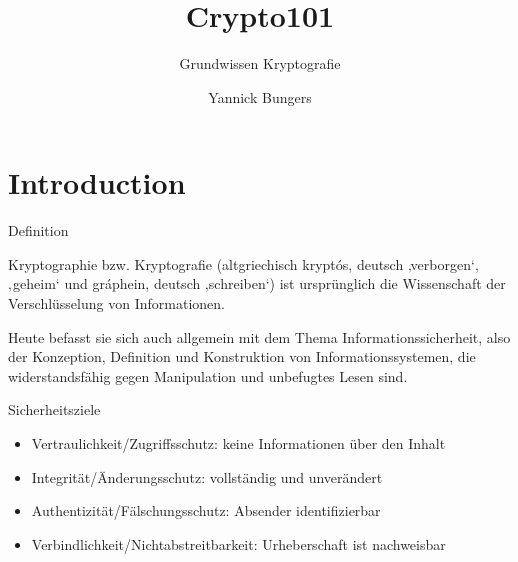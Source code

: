 \documentclass[10pt]{beamer}
\title{Crypto101}
\subtitle{Grundwissen Kryptografie}
\date{}
\author{Yannick Bungers}
\institute{Free and Open Source Software AG}
\begin{document}
	
	\maketitle
	
	
	\section[Ziele]{Introduction}
	
	\begin{frame}[fragile]{Definition}
		
		Kryptographie bzw. Kryptografie (altgriechisch kryptós, deutsch ‚verborgen‘, ‚geheim‘ und gráphein, deutsch ‚schreiben‘) ist ursprünglich die Wissenschaft der Verschlüsselung von Informationen.
		
		Heute befasst sie sich auch allgemein mit dem Thema Informationssicherheit, also der Konzeption, Definition und Konstruktion von Informationssystemen, die widerstandsfähig gegen Manipulation und unbefugtes Lesen sind. 
		
		
	\end{frame}
	\begin{frame}[fragile]{Sicherheitsziele}
		\begin{itemize}
			\item \alert{Vertraulichkeit/Zugriffsschutz}: keine Informationen über den Inhalt
			\vspace{0.5cm}
			\item \alert{Integrität/Änderungsschutz}: vollständig und unverändert
			\vspace{0.5cm}
			\item \alert{Authentizität/Fälschungsschutz}: Absender identifizierbar
			\vspace{0.5cm}
			\item \alert{Verbindlichkeit/Nichtabstreitbarkeit}: Urheberschaft ist nachweisbar
		\end{itemize}
		
	\end{frame}
	
\end{document}
